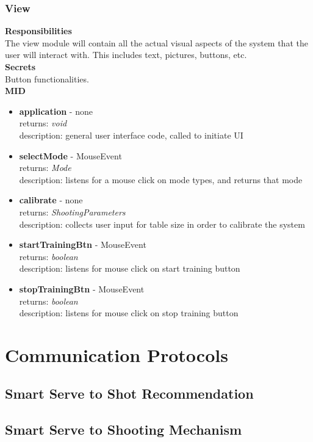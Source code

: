 \documentclass[11pt]{article}
\begin{document}
\subsubsection*{View}
\textbf{Responsibilities} \\
The view module will contain all the actual visual aspects of the system that the user will interact with. This includes text, pictures, buttons, etc. \\
\textbf{Secrets} \\ 
Button functionalities. \\ 
\textbf{MID} \\
\begin{itemize}
\item \textbf{application} - none \\ returns: \textit{void} \\ description: general user interface code, called to initiate UI
\item \textbf{selectMode} - MouseEvent \\ returns: \textit{Mode} \\ description: listens for a mouse click on mode types, and returns that mode
\item \textbf{calibrate} - none \\ returns: \textit{ShootingParameters} \\ description: collects user input for table size in order to calibrate the system
\item \textbf{startTrainingBtn} - MouseEvent \\ returns: \textit{boolean} \\ description: listens for mouse click on start training button
\item \textbf{stopTrainingBtn} - MouseEvent \\ returns: \textit{boolean} \\ description: listens for mouse click on stop training button


\end{itemize}

\section{Communication Protocols}
\subsection{Smart Serve to Shot Recommendation}
\subsection{Smart Serve to Shooting Mechanism}
\end{document}
